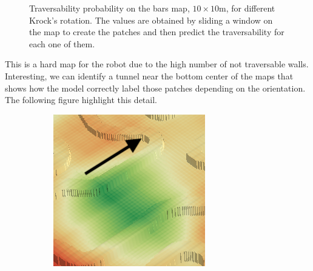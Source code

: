\documentclass[../document.tex]{subfiles}
\begin{document}
\begin{figure}[H]
\begin{subfigure}[b]{0.45\textwidth}
  \end{subfigure}
  \caption{Traversability probability on the bars map, $10\times 10$m, for different Krock's rotation. The values are obtained by sliding a window on the map to create the patches and then predict the traversability for each one of them.}
  \end{figure}

This is a hard map for the robot due to the high number of not traversable walls. Interesting, we can identify a tunnel near the bottom center of the maps that shows how the model correctly label those patches depending on the orientation. The following figure highlight this detail.

\begin{figure}[H]
  \centering
  \begin{subfigure}[b]{0.23\textwidth}
    \includegraphics[width=\linewidth]{../img/4/traversability/bars/tunnel/-270-crop.png} 
  \end{subfigure}
  \begin{subfigure}[b]{0.23\textwidth}

\end{subfigure}
\end{figure}
\end{document}
